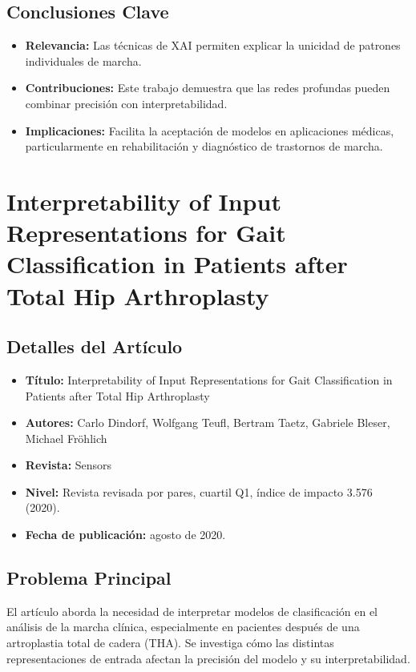\documentclass{report}
\begin{document}
\subsection{Conclusiones Clave}
\begin{itemize}
    \item \textbf{Relevancia:} Las técnicas de XAI permiten explicar la unicidad de patrones individuales de marcha.
    \item \textbf{Contribuciones:} Este trabajo demuestra que las redes profundas pueden combinar precisión con interpretabilidad.
    \item \textbf{Implicaciones:} Facilita la aceptación de modelos en aplicaciones médicas, particularmente en rehabilitación y diagnóstico de trastornos de marcha.
\end{itemize}


\section{Interpretability of Input Representations for Gait Classification in Patients after Total Hip Arthroplasty}

\subsection{Detalles del Artículo}
\begin{itemize}
    \item \textbf{Título:} Interpretability of Input Representations for Gait Classification in Patients after Total Hip Arthroplasty
    \item \textbf{Autores:} Carlo Dindorf, Wolfgang Teufl, Bertram Taetz, Gabriele Bleser, Michael Fröhlich
    \item \textbf{Revista:} Sensors
    \item \textbf{Nivel:} Revista revisada por pares, cuartil Q1, índice de impacto 3.576 (2020).
    \item \textbf{Fecha de publicación:} agosto de 2020.
\end{itemize}

\subsection{Problema Principal}
El artículo aborda la necesidad de interpretar modelos de clasificación en el análisis de la marcha clínica, especialmente en pacientes después de una artroplastia total de cadera (THA). Se investiga cómo las distintas representaciones de entrada afectan la precisión del modelo y su interpretabilidad.
\end{document}
